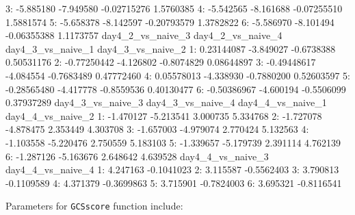 \documentclass[12pt]{article}
\newcommand{\Rfunction}[1]{{\texttt{#1}}}
\begin{document}
\begin{Schunk}
\begin{Soutput}
3:         -5.885180         -7.949580       -0.02715276         1.5760385
4:         -5.542565         -8.161688       -0.07255510         1.5881574
5:         -5.658378         -8.142597       -0.20793579         1.3782822
6:         -5.586970         -8.101494       -0.06355388         1.1173757
   day4_2_vs_naive_3 day4_2_vs_naive_4 day4_3_vs_naive_1 day4_3_vs_naive_2
1:        0.23144087         -3.849027        -0.6738388        0.50531176
2:       -0.77250442         -4.126802        -0.8074829        0.08644897
3:       -0.49448617         -4.084554        -0.7683489        0.47772460
4:        0.05578013         -4.338930        -0.7880200        0.52603597
5:       -0.28565480         -4.417778        -0.8559536        0.40130477
6:       -0.50386967         -4.600194        -0.5506099        0.37937289
   day4_3_vs_naive_3 day4_3_vs_naive_4 day4_4_vs_naive_1 day4_4_vs_naive_2
1:         -1.470127         -5.213541          3.000735          5.334768
2:         -1.727078         -4.878475          2.353449          4.303708
3:         -1.657003         -4.979074          2.770424          5.132563
4:         -1.103558         -5.220476          2.750559          5.183103
5:         -1.339657         -5.179739          2.391114          4.762139
6:         -1.287126         -5.163676          2.648642          4.639528
   day4_4_vs_naive_3 day4_4_vs_naive_4
1:          4.247163        -0.1041023
2:          3.115587        -0.5562403
3:          3.790813        -0.1109589
4:          4.371379        -0.3699863
5:          3.715901        -0.7824003
6:          3.695321        -0.8116541
\end{Soutput}
\end{Schunk}

Parameters for \Rfunction{GCSscore} function include:
\end{document}

